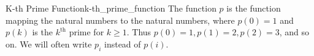 \begin{definition}
{K-th Prime Function}{k-th_prime_function}
The function \(p\) is the function mapping the natural numbers to the natural
numbers, where \(p(0) = 1\) and \(p(k)\) is the \(k^{\text {th}}\) prime for \(k
\geq 1\). Thus \(p(0) = 1, p(1) = 2, p(2) = 3\), and so on. We will often write
\(p_{i}\) instead of \(p(i)\).
\end{definition}


